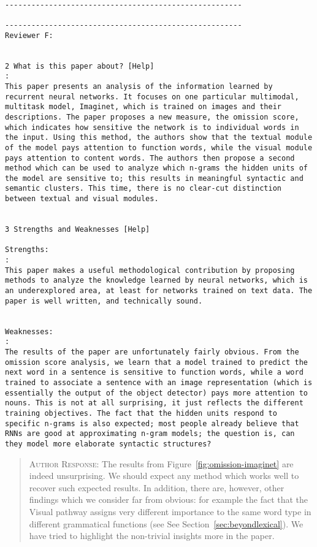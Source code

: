\begin{verbatim}

------------------------------------------------------

------------------------------------------------------
Reviewer F:


2 What is this paper about? [Help]
: 
This paper presents an analysis of the information learned by
recurrent neural networks. It focuses on one particular multimodal,
multitask model, Imaginet, which is trained on images and their
descriptions. The paper proposes a new measure, the omission score,
which indicates how sensitive the network is to individual words in
the input. Using this method, the authors show that the textual module
of the model pays attention to function words, while the visual module
pays attention to content words. The authors then propose a second
method which can be used to analyze which n-grams the hidden units of
the model are sensitive to; this results in meaningful syntactic and
semantic clusters. This time, there is no clear-cut distinction
between textual and visual modules.


3 Strengths and Weaknesses [Help]

Strengths:
: 
This paper makes a useful methodological contribution by proposing
methods to analyze the knowledge learned by neural networks, which is
an underexplored area, at least for networks trained on text data. The
paper is well written, and technically sound.


Weaknesses:
: 
The results of the paper are unfortunately fairly obvious. From the
omission score analysis, we learn that a model trained to predict the
next word in a sentence is sensitive to function words, while a word
trained to associate a sentence with an image representation (which is
essentially the output of the object detector) pays more attention to
nouns. This is not at all surprising, it just reflects the different
training objectives. The fact that the hidden units respond to
specific n-grams is also expected; most people already believe that
RNNs are good at approximating n-gram models; the question is, can
they model more elaborate syntactic structures?
\end{verbatim}  
\begin{quote}
\textsc{Author Response:}  
The results from Figure~\ref{fig:omission-imaginet} are indeed
unsurprising. We should expect any method which works well to recover
such expected results. In addition, there are, however, other findings
which we consider far from obvious: for example the fact that the
{\sc Visual} pathway assigns very different importance to the same
word type in different grammatical functions (see See
Section~\ref{sec:beyondlexical}). We have tried to highlight the
non-trivial insights more in the paper. 


\end{quote}
